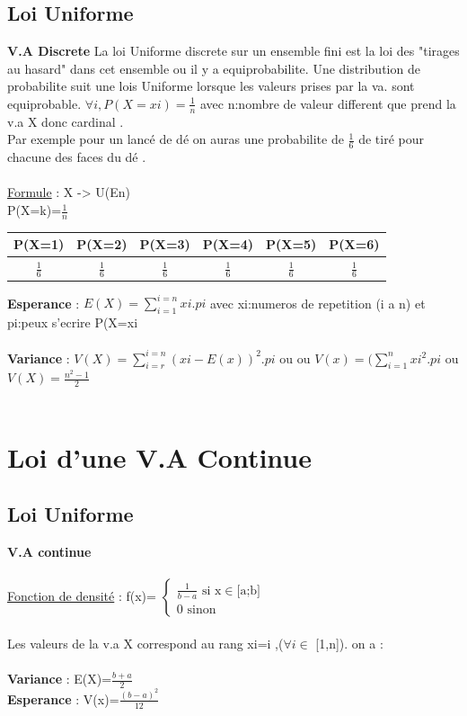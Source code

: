 \documentclass[a4paper,8pt,openany]{book}
\begin{document}
\subsection{Loi Uniforme}
\textbf{V.A Discrete}
La loi Uniforme discrete sur un ensemble fini est la loi des "tirages au hasard" dans cet ensemble ou il y a equiprobabilite.
Une distribution de probabilite suit une lois Uniforme lorsque les valeurs prises par la va. sont equiprobable.
$\forall i , P(X=xi) = \frac{1}{n}$ avec n:nombre de valeur different que prend la v.a X donc cardinal .\\
Par exemple pour un lanc\'e de d\'e on auras une probabilite de $\frac{1}{6}$ de tir\'e  pour chacune des faces du d\'e .\\
\\
\underline{Formule} : X -> U(En) \\
P(X=k)=$\frac{1}{n}$ \\

\begin{center}
\begin{tabular}{|c|c|c|c|c|c|}
\hline
P(X=1) & P(X=2) & P(X=3) & P(X=4) & P(X=5) & P(X=6) \\ \hline
$\frac{1}{6}$ & $\frac{1}{6}$ & $\frac{1}{6}$ & $\frac{1}{6}$ & $\frac{1}{6}$ & $\frac{1}{6}$ \\ \hline
\end{tabular}
\end{center}

\textbf{Esperance} : $E(X)=\sum\limits_{i=1}^{i=n} xi.pi$ avec xi:numeros de repetition (i a n) 
et pi:peux s'ecrire P(X=xi\\
\\
\textbf{Variance} : $V(X)=\sum\limits_{i=r}^{i=n}(xi-E(x))^2.pi$ ou ou $V(x)=(\sum\limits_{i=1}^n xi^2 .pi$ ou $V(X)=\frac{n^2-1}{2}$\\
\\

\section{Loi d'une V.A Continue}

\subsection{Loi Uniforme}
\textbf{V.A continue}\\
\\
\underline{Fonction de densit\'e} : f(x)= $\left\{
\begin{array}{l}
  \frac{1}{b-a} \text{ si x} \in \text{[a;b]} \\
  0 \text{ sinon}
\end{array}
\right.$\\
\\
Les valeurs de la v.a X correspond au rang xi=i ,($\forall i \in$ [1,n]). on a :\\
\\
\textbf{Variance} : E(X)=$\frac{b+a}{2}$ \\
\textbf{Esperance} : V(x)=$\frac{(b-a)^2}{12}$\\
\end{document}
